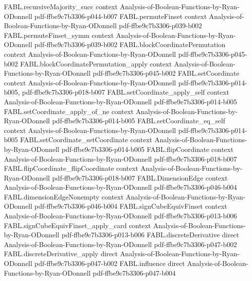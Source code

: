 \begin{theorem}
\proofstep
  {FABL.recursiveMajority_succ}
  {context}
  {Analysis-of-Boolean-Functions-by-Ryan-ODonnell}
  {pdf-ffbe9c7b3306-p044-b007}
\proofstep
  {FABL.permuteFinset}
  {context}
  {Analysis-of-Boolean-Functions-by-Ryan-ODonnell}
  {pdf-ffbe9c7b3306-p039-b002}
\proofstep
  {FABL.permuteFinset_symm}
  {context}
  {Analysis-of-Boolean-Functions-by-Ryan-ODonnell}
  {pdf-ffbe9c7b3306-p039-b002}
\proofstep
  {FABL.blockCoordinatePermutation}
  {context}
  {Analysis-of-Boolean-Functions-by-Ryan-ODonnell}
  {pdf-ffbe9c7b3306-p045-b002}
\proofstep
  {FABL.blockCoordinatePermutation_apply}
  {context}
  {Analysis-of-Boolean-Functions-by-Ryan-ODonnell}
  {pdf-ffbe9c7b3306-p045-b002}
\proofstep
  {FABL.setCoordinate}
  {context}
  {Analysis-of-Boolean-Functions-by-Ryan-ODonnell}
  {pdf-ffbe9c7b3306-p014-b005,
    pdf-ffbe9c7b3306-p018-b007}
\proofstep
  {FABL.setCoordinate_apply_self}
  {context}
  {Analysis-of-Boolean-Functions-by-Ryan-ODonnell}
  {pdf-ffbe9c7b3306-p014-b005}
\proofstep
  {FABL.setCoordinate_apply_of_ne}
  {context}
  {Analysis-of-Boolean-Functions-by-Ryan-ODonnell}
  {pdf-ffbe9c7b3306-p014-b005}
\proofstep
  {FABL.setCoordinate_eq_self}
  {context}
  {Analysis-of-Boolean-Functions-by-Ryan-ODonnell}
  {pdf-ffbe9c7b3306-p014-b005}
\proofstep
  {FABL.setCoordinate_setCoordinate}
  {context}
  {Analysis-of-Boolean-Functions-by-Ryan-ODonnell}
  {pdf-ffbe9c7b3306-p014-b005}
\proofstep
  {FABL.flipCoordinate}
  {context}
  {Analysis-of-Boolean-Functions-by-Ryan-ODonnell}
  {pdf-ffbe9c7b3306-p018-b007}
\proofstep
  {FABL.flipCoordinate_flipCoordinate}
  {context}
  {Analysis-of-Boolean-Functions-by-Ryan-ODonnell}
  {pdf-ffbe9c7b3306-p018-b007}
\proofstep
  {FABL.DimensionEdge}
  {context}
  {Analysis-of-Boolean-Functions-by-Ryan-ODonnell}
  {pdf-ffbe9c7b3306-p046-b004}
\proofstep
  {FABL.dimensionEdgeNonempty}
  {context}
  {Analysis-of-Boolean-Functions-by-Ryan-ODonnell}
  {pdf-ffbe9c7b3306-p046-b004}
\proofstep
  {FABL.signCubeEquivFinset}
  {context}
  {Analysis-of-Boolean-Functions-by-Ryan-ODonnell}
  {pdf-ffbe9c7b3306-p013-b006}
\proofstep
  {FABL.signCubeEquivFinset_apply_card}
  {context}
  {Analysis-of-Boolean-Functions-by-Ryan-ODonnell}
  {pdf-ffbe9c7b3306-p013-b006}
\proofstep
  {FABL.discreteDerivative}
  {direct}
  {Analysis-of-Boolean-Functions-by-Ryan-ODonnell}
  {pdf-ffbe9c7b3306-p047-b002}
\proofstep
  {FABL.discreteDerivative_apply}
  {direct}
  {Analysis-of-Boolean-Functions-by-Ryan-ODonnell}
  {pdf-ffbe9c7b3306-p047-b002}
\proofstep
  {FABL.influence}
  {direct}
  {Analysis-of-Boolean-Functions-by-Ryan-ODonnell}
  {pdf-ffbe9c7b3306-p047-b004}

\end{theorem}
